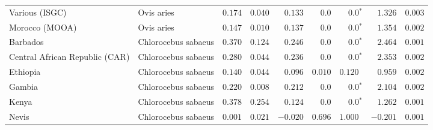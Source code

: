 \begin{center}
\begin{adjustbox}{width = 1\textwidth}
\begin{tabular}{|l|l|r|r|r|r|r|r|r|}
                 Various (ISGC) &           Ovis aries &                                        $ 0.174$ &                                           $ 0.040$ &                      $ 0.133$ &            $0.0$ &                  $\bm{0.0{^*}}$ &                                           $ 1.326$ &           $ 0.003$ \\
                 Morocco (MOOA) &           Ovis aries &                                        $ 0.147$ &                                           $ 0.010$ &                      $ 0.137$ &            $0.0$ &                  $\bm{0.0{^*}}$ &                                           $ 1.354$ &           $ 0.002$ \\
                       Barbados &  Chlorocebus sabaeus &                                        $ 0.370$ &                                           $ 0.124$ &                      $ 0.246$ &            $0.0$ &                  $\bm{0.0{^*}}$ &                                           $ 2.464$ &           $ 0.001$ \\
 Central African Republic (CAR) &  Chlorocebus sabaeus &                                        $ 0.280$ &                                           $ 0.044$ &                      $ 0.236$ &            $0.0$ &                  $\bm{0.0{^*}}$ &                                           $ 2.353$ &           $ 0.002$ \\
                       Ethiopia &  Chlorocebus sabaeus &                                        $ 0.140$ &                                           $ 0.044$ &                      $ 0.096$ &         $ 0.010$ &                      $ 0.120~~$ &                                           $ 0.959$ &           $ 0.002$ \\
                         Gambia &  Chlorocebus sabaeus &                                        $ 0.220$ &                                           $ 0.008$ &                      $ 0.212$ &            $0.0$ &                  $\bm{0.0{^*}}$ &                                           $ 2.104$ &           $ 0.002$ \\
                          Kenya &  Chlorocebus sabaeus &                                        $ 0.378$ &                                           $ 0.254$ &                      $ 0.124$ &            $0.0$ &                  $\bm{0.0{^*}}$ &                                           $ 1.262$ &           $ 0.001$ \\
                          Nevis &  Chlorocebus sabaeus &                                        $ 0.001$ &                                           $ 0.021$ &                      $-0.020$ &         $ 0.696$ &                      $ 1.000~~$ &                                           $-0.201$ &           $ 0.001$ \\

\end{tabular}
\end{adjustbox}
\end{center}
